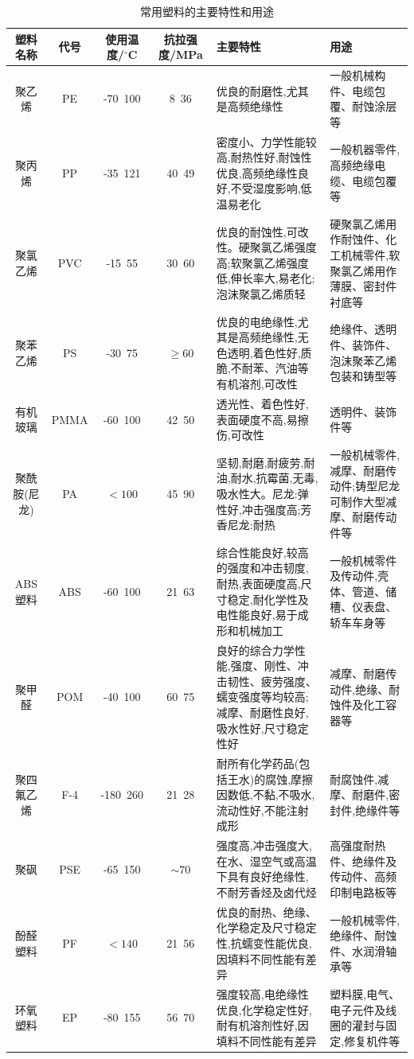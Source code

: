 \documentclass[UTF8]{ctexbook}
\newcommand{\◎}{\ensuremath{\bigcirc}}
\begin{document}
\begin{table}[H]
\centering
\caption{常用塑料的主要特性和用途}
\label{tab:plastic_properties}
\small
\begin{tabular}{|c|c|c|c|p{3.5cm}|p{3.5cm}|}
\hline
塑料名称 & 代号 & 使用温度/$^\circ$C & 抗拉强度/MPa & 主要特性 & 用途 \\
\hline
聚乙烯 & PE & -70~100 & 8~36 & 优良的耐磨性,尤其是高频绝缘性 & 一般机械构件、电缆包覆、耐蚀涂层等 \\
\hline
聚丙烯 & PP & -35~121 & 40~49 & 密度小、力学性能较高,耐热性好,耐蚀性优良,高频绝缘性良好,不受湿度影响,低温易老化 & 一般机器零件,高频绝缘电缆、电缆包覆等 \\
\hline
聚氯乙烯 & PVC & -15~55 & 30~60 & 优良的耐蚀性,可改性。硬聚氯乙烯强度高;软聚氯乙烯强度低,伸长率大,易老化;泡沫聚氯乙烯质轻 & 硬聚氯乙烯用作耐蚀件、化工机械零件,软聚氯乙烯用作薄膜、密封件衬底等 \\
\hline
聚苯乙烯 & PS & -30~75 & $\geqslant 60$ & 优良的电绝缘性,尤其是高频绝缘性,无色透明,着色性好,质脆,不耐苯、汽油等有机溶剂,可改性 & 绝缘件、透明件、装饰件、泡沫聚苯乙烯包装和铸型等 \\
\hline
有机玻璃 & PMMA & -60~100 & 42~50 & 透光性、着色性好,表面硬度不高,易擦伤,可改性 & 透明件、装饰件等 \\
\hline
聚酰胺(尼龙) & PA & $<100$ & 45~90 & 坚韧,耐磨,耐疲劳,耐油,耐水,抗霉菌,无毒,吸水性大。尼龙:弹性好,冲击强度高;芳香尼龙:耐热 & 一般机械零件,减摩、耐磨传动件;铸型尼龙可制作大型减摩、耐磨传动件等 \\
\hline
ABS 塑料 & ABS & -60~100 & 21~63 & 综合性能良好,较高的强度和冲击韧度,耐热,表面硬度高,尺寸稳定,耐化学性及电性能良好,易于成形和机械加工 & 一般机械零件及传动件,壳体、管道、储槽、仪表盘、轿车车身等 \\
\hline
聚甲醛 & POM & -40~100 & 60~75 & 良好的综合力学性能,强度、刚性、冲击韧性、疲劳强度、蠕变强度等均较高;减摩、耐磨性良好,吸水性好,尺寸稳定性好 & 减摩、耐磨传动件,绝缘、耐蚀件及化工容器等 \\
\hline
聚四氟乙烯 & F-4 & -180~260 & 21~28 & 耐所有化学药品(包括王水)的腐蚀,摩擦因数低,不黏,不吸水,流动性好,不能注射成形 & 耐腐蚀件,减摩、耐磨件,密封件,绝缘件等 \\
\hline
聚砜 & PSE & -65~150 & $\sim 70$ & 强度高,冲击强度大,在水、湿空气或高温下具有良好绝缘性,不耐芳香烃及卤代烃 & 高强度耐热件、绝缘件及传动件、高频印制电路板等 \\
\hline
酚醛塑料 & PF & $<140$ & 21~56 & 优良的耐热、绝缘、化学稳定及尺寸稳定性,抗蠕变性能优良,因填料不同性能有差异 & 一般机械零件,绝缘件、耐蚀件、水润滑轴承等 \\
\hline
环氧塑料 & EP & -80~155 & 56~70 & 强度较高,电绝缘性优良,化学稳定性好,耐有机溶剂性好,因填料不同性能有差异 & 塑料膜,电气、电子元件及线圈的灌封与固定,修复机件等 \\
\hline
\end{tabular}\end{table}
\end{document}
